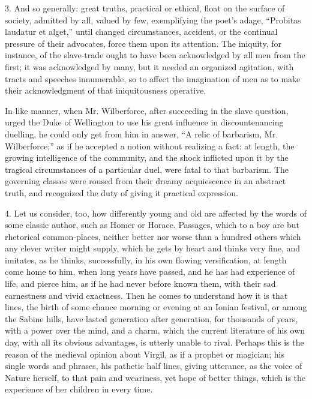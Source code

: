 3. And so generally: great truths, practical or ethical, float on
the surface of society, admitted by all, valued by few, exemplifying
the poet's adage, ``Probitas laudatur et alget,'' until
changed circumstances, accident, or the continual pressure of their
advocates, force them upon its attention. The iniquity, for instance,
of the slave-trade ought to have been acknowledged by all men from the
first; it was acknowledged by many, but it needed an organized
agitation, with tracts and speeches innumerable, so to affect the
imagination of men as to make their acknowledgment of that
iniquitousness operative.

In like manner, when Mr. Wilberforce, after succeeding in the
slave question, urged the Duke of Wellington to use his great
influence in discountenancing duelling, he could only get from him in
answer, ``A relic of barbarism, Mr. Wilberforce;'' as if he
accepted a notion without realizing a fact: at length, the growing
intelligence of the community, and the shock inflicted upon it by the
tragical circumstances of a particular duel, were fatal to that
barbarism. The governing classes were roused from their dreamy
acquiescence in an abstract truth, and recognized the duty of giving
it practical expression.

4. Let us consider, too, how differently young and old are affected
by the words of some classic author, such as Homer or Horace.
Passages, which to a boy are but rhetorical common-places, neither
better nor worse than a hundred others which any clever writer might
supply, which he gets by heart and thinks very fine, and imitates, as
he thinks, successfully, in his own flowing versification, at length
come home to him, when long years have passed, and he has had
experience of life, and pierce him, as if he had never before known
them, with their sad earnestness and vivid exactness. Then he comes to
understand how it is that lines, the birth of some chance morning or
evening at an Ionian festival, or among the Sabine hills, have lasted
generation after generation, for thousands of years, with a power over
the mind, and a charm, which the current literature of his own day,
with all its obvious advantages, is utterly unable to rival. Perhaps
this is the reason of the medieval opinion about Virgil, as if a
prophet or magician; his single words and phrases, his pathetic half
lines, giving utterance, as the voice of Nature herself, to that
pain and weariness, yet hope of better things, which is the experience
of her children in every time.


